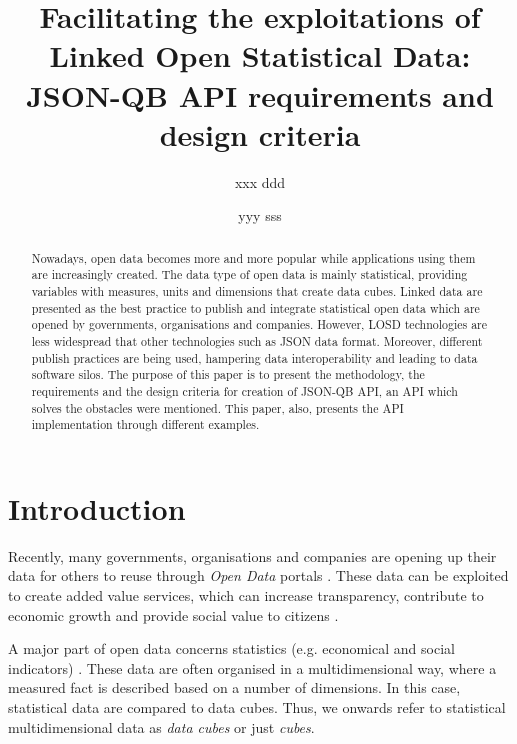 \documentclass{llncs}
\begin{document}
\title{Facilitating the exploitations of Linked Open Statistical Data: JSON-QB API requirements and design criteria}

\author{xxx ddd \and yyy sss}

\maketitle

\begin{abstract}

Nowadays, open data becomes more and more popular while applications using them are increasingly created. The data type of open data is mainly statistical, providing variables with measures, units and dimensions that create data cubes. Linked data are presented as the best practice to publish and integrate statistical open data which are opened by governments, organisations and companies. However, LOSD technologies are less widespread that other technologies such as JSON data format. Moreover, different publish practices are being used, hampering data interoperability and leading to data software silos. The purpose of this paper is to present the methodology, the requirements and the design criteria for creation of JSON-QB API, an API which solves the obstacles were mentioned. This paper, also, presents the API implementation through different examples.

\end{abstract}

\section{Introduction}\label{sec:intro}

Recently, many governments, organisations and companies are opening up their data for others to reuse through \textit{Open Data} portals  \cite{Kalampokis:2011:IJWET}. These data can be exploited to create added value services, which can increase transparency, contribute to economic growth and provide social value to citizens \cite{Janssen:2012}.

A major part of open data concerns statistics (e.g. economical and social indicators) \cite{Capadisli:2013}. These data are often organised in a multidimensional way, where a measured fact is described based on a number of dimensions. In this case, statistical data are compared to data cubes. Thus, we onwards refer to statistical multidimensional data as \textit{data cubes} or just \textit{cubes}.
\end{document}
